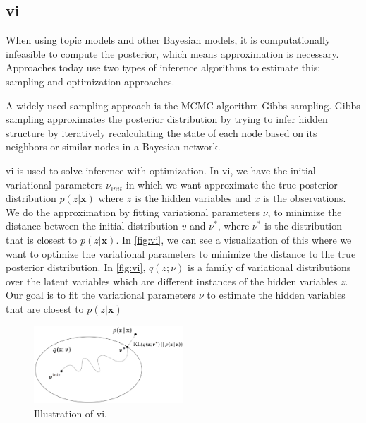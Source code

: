 \subsection{\acrlong{vi}}
When using topic models and other Bayesian models, it is computationally infeasible to compute the posterior, which means approximation is necessary. 
Approaches today use two types of inference algorithms to estimate this; sampling and optimization approaches.

A widely used sampling approach is the MCMC algorithm Gibbs sampling.
Gibbs sampling approximates the posterior distribution by trying to infer hidden structure by iteratively recalculating the state of each node based on its neighbors or similar nodes in a Bayesian network.

\gls{vi} is used to solve inference with optimization.
In \gls{vi}, we have the initial variational parameters $\nu_{init}$ in which we want approximate the true posterior distribution $p(z|\textbf{x})$ where $z$ is the hidden variables and $x$ is the observations.
We do the approximation by fitting variational parameters $\nu$, to minimize the distance between the initial distribution $v$ and $\nu^*$, where $\nu^*$ is the distribution that is closest to $p(z|\textbf{x})$.
In \autoref{fig:vi}, we can see a visualization of this where we want to optimize the variational parameters to minimize the distance to the true posterior distribution.
In \autoref{fig:vi}, $q(z; \nu)$ is a family of variational distributions over the latent variables which are different instances of the hidden variables $z$.
Our goal is to fit the variational parameters $\nu$ to estimate the hidden variables that are closest to $p(z|\textbf{x})$

\begin{figure}
	\centering
	\includegraphics[width=0.5\textwidth]{figures/vi_illustration.png}
	\caption[Caption for LOF]{Illustration of \acrlong{vi}\footnotemark.}
	\label{fig:vi}
\end{figure}

